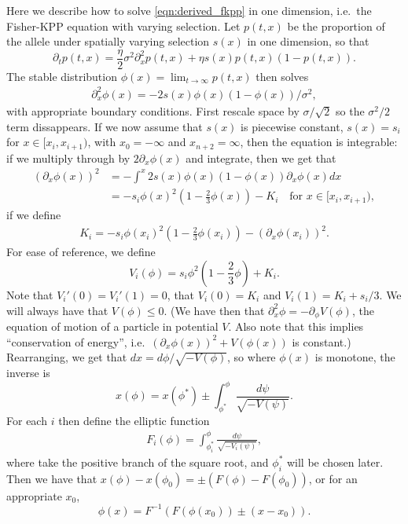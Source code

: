 \documentclass{article}
\begin{document}
Here we describe how to solve \eqref{eqn:derived_fkpp} in one dimension,
i.e.\ the Fisher-KPP equation with varying selection.
Let $p(t,x)$ be the proportion of the allele under spatially varying selection $s(x)$ in one dimension,
so that 
\[
\partial_t p(t,x) = \frac{\eta}{2} \sigma^2 \partial_x^2 p(t,x) + \eta s(x) p(t,x) (1-p(t,x)) .
\]
The stable distribution $\phi(x) = \lim_{t\to\infty} p(t,x)$ then solves
\begin{align} \label{eqn:definingphi}
    \partial_x^2 \phi(x) = - 2 s(x) \phi(x) (1-\phi(x)) /\sigma^2,
\end{align}
with appropriate boundary conditions.
First rescale space by $\sigma/\sqrt{2}$ so the $\sigma^2/2$ term dissappears.
If we now assume that $s(x)$ is piecewise constant,
$s(x) = s_i$ for $x \in [x_i,x_{i+1})$, with $x_0=-\infty$ and $x_{n+2}=\infty$,
then the equation is integrable: if we multiply through by $2\partial_x \phi(x)$ and integrate, then we get that
\begin{align} \label{eqn:conservation}
    ( \partial_x \phi(x) )^2  &= - \int^{x} 2 s(x) \phi(x) (1-\phi(x)) \partial_x \phi(x) dx \\
        &= - s_i \phi(x)^2 \left( 1 - \frac{2}{3} \phi(x) \right) - K_i \quad \mbox{for } x \in [x_i,x_{i+1}) ,
\end{align}
if we define
\begin{align} 
  K_i = - s_i \phi(x_i)^2 \left( 1 - \frac{2}{3} \phi(x_i) \right) - ( \partial_x \phi(x_i) )^2  .
\end{align}
For ease of reference, we define
\[
        V_i(\phi) = s_i \phi^2 \left( 1 - \frac{2}{3} \phi \right) + K_i .
\]
Note that $V_i'(0)=V_i'(1)=0$, that $V_i(0)=K_i$ and $V_i(1) = K_i+s_i/3$.  
We will always have that $V(\phi) \le 0$.
(We have then that $\partial_x^2 \phi = - \partial_\phi V(\phi)$, the equation of motion of a particle in potential $V$.
Also note that this implies ``conservation of energy'', i.e.\ $( \partial_x \phi(x) )^2 + V(\phi(x))$ is constant.)
Rearranging, we get that $dx = d\phi / \sqrt{-V(\phi)}$, so where $\phi(x)$ is monotone, the inverse is
\[
    x(\phi) = x(\phi^*) \pm \int_{\phi^*}^\phi \frac{ d\psi }{ \sqrt{ -V(\psi) } } .
\]
For each $i$ then define the elliptic function
\begin{align}  \label{eqn:elliptic_function}
    F_i(\phi) = \int_{\phi_i^*}^\phi \frac{ d\psi }{ \sqrt{ -V_i(\psi) } } ,
\end{align}
where take the positive branch of the square root, and $\phi_i^*$ will be chosen later.
Then we have that
$x(\phi) - x(\phi_0) = \pm( F(\phi) - F(\phi_0))$,
or for an appropriate $x_0$,
\[
    \phi(x) = F^{-1}\left( F(\phi(x_0)) \pm (x - x_0) \right).
\]
\end{document}
